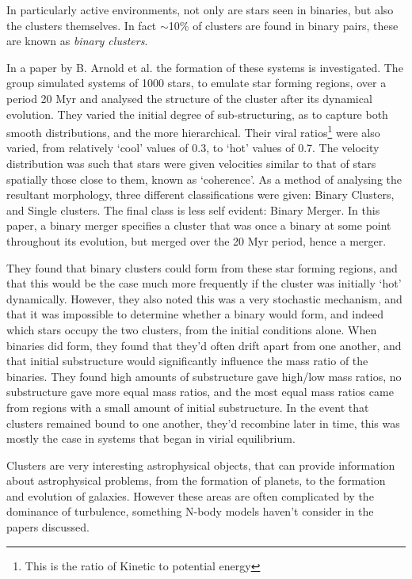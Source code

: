 \documentclass[a4paper,10pt]{article}
\begin{document}
In particularly active environments, not only are stars seen in binaries, but also the clusters themselves. In fact $\sim$10\% of clusters are found in binary pairs, these are known as \textit{binary clusters}. 

In a paper by B. Arnold et al. the formation of these systems is investigated\cite{ClusterBinary}. The group simulated systems of 1000 stars, to emulate star forming regions, over a period 20 Myr and analysed the structure of the cluster after its dynamical evolution. They varied the initial degree of sub-structuring, as to capture both smooth distributions, and the more hierarchical. Their viral ratios\footnote{This is the ratio of Kinetic to potential energy} were also varied, from relatively `cool' values of 0.3, to `hot' values of 0.7. The velocity distribution was such that stars were given velocities similar to that of stars spatially those close to them, known as `coherence'. As a method of analysing the resultant morphology, three different classifications were given: Binary Clusters, and Single clusters. The final class is less self evident: Binary Merger. In this paper, a binary merger specifies a cluster that was once a binary at some point throughout its evolution, but merged over the 20 Myr period, hence a merger.

They found that binary clusters could form from these star forming regions, and that this would be the case much more frequently if the cluster was initially `hot' dynamically. However, they also noted this was a very stochastic mechanism, and that it was impossible to determine whether a binary would form, and indeed which stars occupy the two clusters, from the initial conditions alone. When binaries did form, they found that they'd often drift apart from one another, and that initial substructure would significantly influence the mass ratio of the binaries. They found high amounts of substructure gave high/low mass ratios, no substructure gave more equal mass ratios, and the most equal mass ratios came from regions with a small amount of initial substructure. In the event that clusters remained bound to one another, they'd recombine later in time, this was mostly the case in systems that began in virial equilibrium.

Clusters are very interesting astrophysical objects, that can provide information about astrophysical problems, from the formation of planets, to the formation and evolution of galaxies. However these areas are often complicated by the dominance of turbulence, something N-body models haven't consider in the papers discussed.
\end{document}
